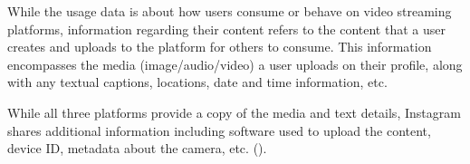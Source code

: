 While the usage data is about how users consume or behave on video streaming platforms, information regarding their content refers to the content that a user creates and uploads to the platform for others to consume. This information encompasses the media (image/audio/video) a user uploads on their profile, along with any textual captions, locations, date and time information, etc.
\begin{table}[t]
\centering
{}
\caption{Details of user created content shared by platforms.}
\label{table:content_details}
\end{table}
While all three platforms provide a copy of the media and text details, Instagram shares additional information including software used to upload the content, device ID, metadata about the camera, etc. ().


